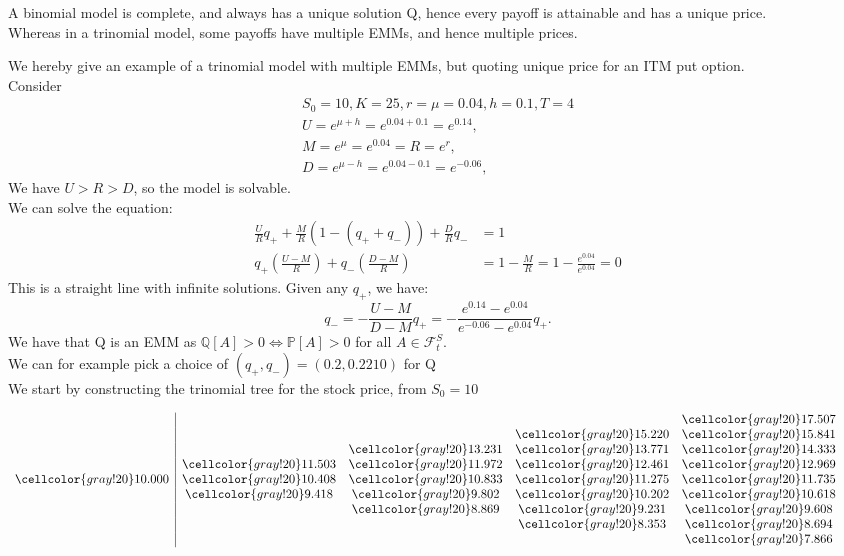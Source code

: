 A binomial model is complete, and always has a unique solution Q, 
hence every payoff is attainable and has a unique price.\\
Whereas in a trinomial model, some payoffs have multiple EMMs, and hence multiple prices.\\

\begin{example}
We hereby give an example of a trinomial model with multiple EMMs, but quoting unique price for an ITM put option.\\
Consider
\begin{align*}
    S_0 = 10, K = 25, r = \mu = 0.04, h = 0.1, T = 4\\
    U = e^{\mu + h} = e^{0.04 + 0.1} = e^{0.14}, \\
    M = e^{\mu} = e^{0.04} = R = e^r , \\
    D = e^{\mu - h} = e^{0.04 - 0.1} = e^{-0.06}, 
\end{align*}
We have $U > R > D$, so the model is solvable.\\
We can solve the equation:
\begin{align*}
    \frac{U}{R}q_+ + \frac{M}{R}(1 - (q_+ + q_-)) + \frac{D}{R}q_- &= 1 \\
    q_+\left(\frac{U - M}{R}\right) + q_-\left(\frac{D - M}{R}\right) &= 1 - \frac{M}{R} = 1 - \frac{e^{0.04}}{e^{0.04}} = 0
\end{align*}
This is a straight line with infinite solutions. Given any $ q_+ $, we have:
$$
q_- = - \frac{U-M}{D-M}q_+ =
- \frac{e^{0.14} - e^{0.04}}{e^{-0.06} - e^{0.04}}q_+.
$$
We have that Q is an EMM as $\mathbb{Q}[A] > 0 
\iff \mathbb{P}[A] > 0 $ for all $A \in \mathcal{F}^S_t$.\\
We can for example pick a choice of $ (q_+, q_-) = (0.2, 0.2210) $ for Q \\
We start by constructing the trinomial tree for the stock price, from $ S_0 = 10 $ 

\[
\begin{array}{c|cccccc}
 & & & &  \cellcolor{gray!20}17.507 & & \\
 & & & \cellcolor{gray!20}15.220 & \cellcolor{gray!20}15.841 & & \\
 & & \cellcolor{gray!20}13.231 & \cellcolor{gray!20}13.771 & \cellcolor{gray!20}14.333 & & \\
 & \cellcolor{gray!20}11.503 & \cellcolor{gray!20}11.972 & \cellcolor{gray!20}12.461 & \cellcolor{gray!20}12.969 & & \\
\cellcolor{gray!20}10.000 & \cellcolor{gray!20}10.408 & \cellcolor{gray!20}10.833 & \cellcolor{gray!20}11.275 & \cellcolor{gray!20}11.735 & & \\
 & \cellcolor{gray!20}9.418 & \cellcolor{gray!20}9.802 & \cellcolor{gray!20}10.202 & \cellcolor{gray!20}10.618 & & \\
 & & \cellcolor{gray!20}8.869 & \cellcolor{gray!20}9.231 & \cellcolor{gray!20}9.608 & & \\
 & & & \cellcolor{gray!20}8.353 & \cellcolor{gray!20}8.694 & & \\
 & & & & \cellcolor{gray!20}7.866 & &
\end{array}
\]


\end{example}
